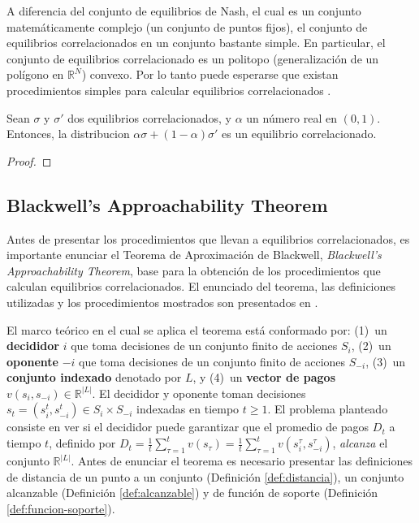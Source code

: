 A diferencia del conjunto de equilibrios de Nash, el cual es un conjunto matemáticamente complejo (un conjunto de puntos fijos), el conjunto de equilibrios correlacionados en un conjunto bastante simple. En particular, el conjunto de equilibrios correlacionado es un politopo (generalización de un polígono en $\mathbb{R}^N$) convexo. Por lo tanto puede esperarse que existan procedimientos simples para calcular equilibrios correlacionados \cite{bib:correlated-equilibrium}.

\begin{theorem}
Sean $\sigma$ y $\sigma'$ dos equilibrios correlacionados, y $\alpha$ un número real en $(0,1)$. Entonces, la distribucion $\alpha\sigma + (1-\alpha)\sigma'$ es un equilibrio correlacionado.
\end{theorem}
\begin{proof}
\end{proof}

\subsection{Blackwell's Approachability Theorem}
Antes de presentar los procedimientos que llevan a equilibrios correlacionados, es importante enunciar el Teorema de Aproximación de Blackwell, \textit{Blackwell's Approachability Theorem}, base para la obtención de los procedimientos que calculan equilibrios correlacionados. El enunciado del teorema, las definiciones utilizadas y los procedimientos mostrados son presentados en \cite{bib:correlated-equilibrium}.

El marco teórico en el cual se aplica el teorema está conformado por: (1)~un \textbf{decididor} $i$ que toma decisiones de un conjunto finito de acciones $S_i$, (2)~un \textbf{oponente} $-i$ que toma decisiones de un conjunto finito de acciones $S_{-i}$, (3)~un \textbf{conjunto indexado} denotado por $L$, y (4)~un \textbf{vector de pagos} $v(s_i, s_{-i}) \in \mathbb{R}^{|L|}$.
El decididor y oponente toman decisiones $s_t=(s^t_i,s^t_{-i})\in S_i\times S_{-i}$ indexadas en tiempo $t\geq 1$. El problema planteado consiste en ver si el decididor puede garantizar que el promedio de pagos $D_t$ a tiempo $t$, definido por $D_t=\frac{1}{t}\sum_{\tau=1}^t v(s_\tau)=\frac{1}{t}\sum_{\tau=1}^t v(s^\tau_i,s^\tau_{-i})$, \emph{alcanza} el conjunto $\mathbb{R}^{|L|}$.
Antes de enunciar el teorema es necesario presentar las definiciones de distancia de un punto a un conjunto (Definición \ref{def:distancia}), un conjunto alcanzable (Definición \ref{def:alcanzable}) y de función de soporte (Definición \ref{def:funcion-soporte}).

